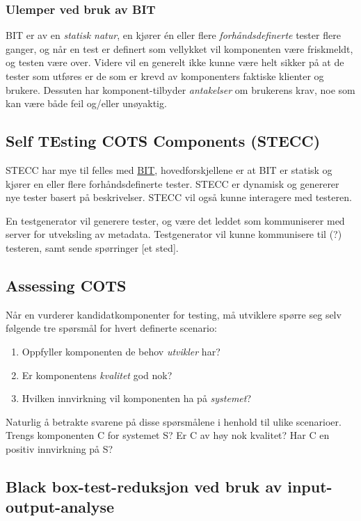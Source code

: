 \subsubsection{Ulemper ved bruk av BIT}

BIT er av en \emph{statisk natur}, en kjører én eller flere
\emph{forhåndsdefinerte} tester flere ganger, og når en test er definert
som vellykket vil komponenten være friskmeldt, og testen være over.
Videre vil en generelt ikke kunne være helt sikker på at de tester som
utføres er de som er krevd av komponenters faktiske klienter og brukere.
Dessuten har komponent-tilbyder \emph{antakelser} om brukerens krav, noe
som kan være både feil og/eller unøyaktig.

\subsection{Self TEsting COTS Components (STECC)}

STECC har mye til felles med \href{\#built-intest}{BIT},
hovedforskjellene er at BIT er statisk og kjører en eller flere
forhåndsdefinerte tester. STECC er dynamisk og genererer nye tester
basert på beskrivelser. STECC vil også kunne interagere med testeren.

En testgenerator vil generere tester, og være det leddet som
kommuniserer med server for utveksling av metadata. Testgenerator vil
kunne kommunisere til (?) testeren, samt sende spørringer {[}et sted{]}.

\subsection{Assessing COTS}

Når en vurderer kandidatkomponenter for testing, må utviklere spørre seg
selv følgende tre spørsmål for hvert definerte scenario:

\begin{enumerate}[1.]
\item
  Oppfyller komponenten de behov \emph{utvikler} har?
\item
  Er komponentens \emph{kvalitet} god nok?
\item
  Hvilken innvirkning vil komponenten ha på \emph{systemet}?
\end{enumerate}
Naturlig å betrakte svarene på disse spørsmålene i henhold til ulike
scenarioer. Trengs komponenten C for systemet S? Er C av høy nok
kvalitet? Har C en positiv innvirkning på S?

\subsection{Black box-test-reduksjon ved bruk av input-output-analyse}


